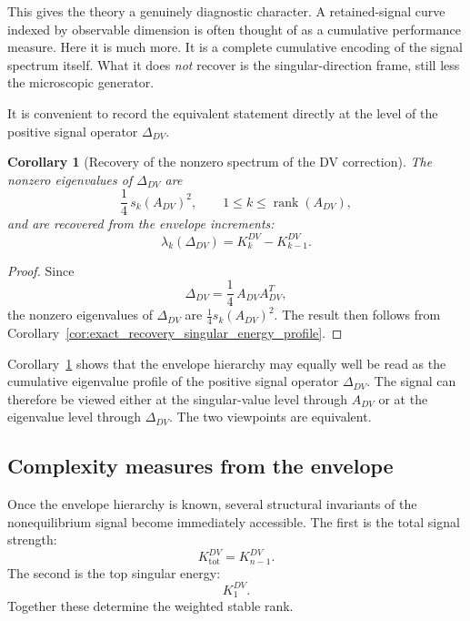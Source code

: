 \documentclass[11pt,a4paper]{article}
\numberwithin{equation}{section}
\theoremstyle{thmcompact}
\newtheorem{corollary}[theorem]{Corollary}
\theoremstyle{remark}
\begin{document}
This gives the theory a genuinely diagnostic character. A retained-signal curve indexed by observable dimension is often thought of as a cumulative performance measure. Here it is much more. It is a complete cumulative encoding of the signal spectrum itself. What it does \emph{not} recover is the singular-direction frame, still less the microscopic generator.

It is convenient to record the equivalent statement directly at the level of the positive signal operator \(\Delta_{DV}\).

\begin{corollary}[Recovery of the nonzero spectrum of the DV correction]
\label{cor:recovery_spectrum_DV_correction}
The nonzero eigenvalues of \(\Delta_{DV}\) are
\begin{equation}
\frac14\,s_k(A_{DV})^2,
\qquad
1\le k\le \operatorname{rank}(A_{DV}),
\end{equation}
and are recovered from the envelope increments:
\begin{equation}
\lambda_k(\Delta_{DV})
=
K_k^{DV}-K_{k-1}^{DV}.
\end{equation}
\end{corollary}

\begin{proof}
Since
\begin{equation}
\Delta_{DV}=\frac14\,A_{DV}A_{DV}^{T},
\end{equation}
the nonzero eigenvalues of \(\Delta_{DV}\) are \(\frac14 s_k(A_{DV})^2\). The result then follows from Corollary~\ref{cor:exact_recovery_singular_energy_profile}.
\end{proof}

Corollary~\ref{cor:recovery_spectrum_DV_correction} shows that the envelope hierarchy may equally well be read as the cumulative eigenvalue profile of the positive signal operator \(\Delta_{DV}\). The signal can therefore be viewed either at the singular-value level through \(A_{DV}\) or at the eigenvalue level through \(\Delta_{DV}\). The two viewpoints are equivalent.

\subsection{Complexity measures from the envelope}

Once the envelope hierarchy is known, several structural invariants of the nonequilibrium signal become immediately accessible. The first is the total signal strength:
\begin{equation}
K_{\mathrm{tot}}^{DV}
=
K_{n-1}^{DV}.
\end{equation}
The second is the top singular energy:
\begin{equation}
K_1^{DV}.
\end{equation}
Together these determine the weighted stable rank.
\end{document}
